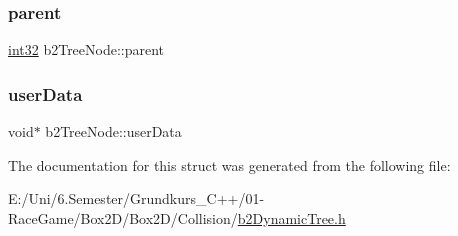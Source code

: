 \subsubsection{\texorpdfstring{parent}{parent}}
{\footnotesize\ttfamily \mbox{\hyperlink{b2_settings_8h_a43d43196463bde49cb067f5c20ab8481}{int32}} b2\+Tree\+Node\+::parent}

\mbox{\label{structb2_tree_node_aff77b3eb48326aca1b0762f5c45e56e7}} 
\subsubsection{\texorpdfstring{userData}{userData}}
{\footnotesize\ttfamily void$\ast$ b2\+Tree\+Node\+::user\+Data}



The documentation for this struct was generated from the following file\+:\begin{DoxyCompactItemize}
\item 
E\+:/\+Uni/6.\+Semester/\+Grundkurs\+\_\+\+C++/01-\/\+Race\+Game/\+Box2\+D/\+Box2\+D/\+Collision/\mbox{\hyperlink{b2_dynamic_tree_8h}{b2\+Dynamic\+Tree.\+h}}\end{DoxyCompactItemize}
